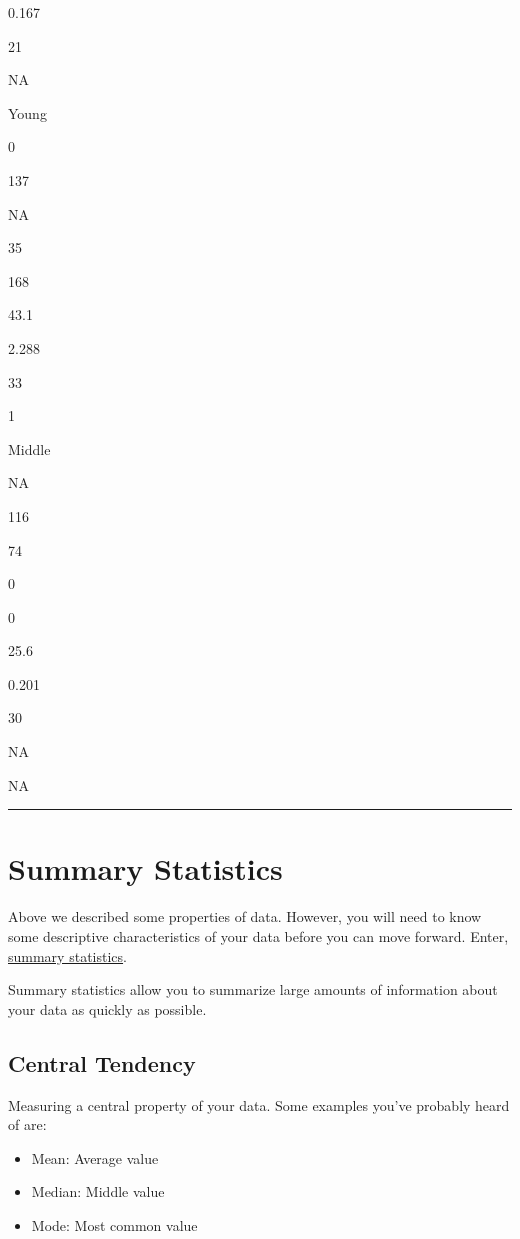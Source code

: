 \documentclass[
  letterpaper,
  DIV=11,
  numbers=noendperiod]{scrreprt}
\begin{document}
0.167

21

NA

Young

0

137

NA

35

168

43.1

2.288

33

1

Middle

NA

116

74

0

0

25.6

0.201

30

NA

NA

\begin{center}\rule{0.5\linewidth}{0.5pt}\end{center}

\hypertarget{summary-statistics}{%
\section{Summary Statistics}\label{summary-statistics}}

Above we described some properties of data. However, you will need to
know some descriptive characteristics of your data before you can move
forward. Enter,
\href{https://en.wikipedia.org/wiki/Summary_statistics}{summary
statistics}.

Summary statistics allow you to summarize large amounts of information
about your data as quickly as possible.

\hypertarget{central-tendency}{%
\subsection{Central Tendency}\label{central-tendency}}

Measuring a central property of your data. Some examples you've probably
heard of are:

\begin{itemize}
\item
  Mean: Average value
\item
  Median: Middle value
\item
  Mode: Most common value
\end{itemize}
\end{document}

